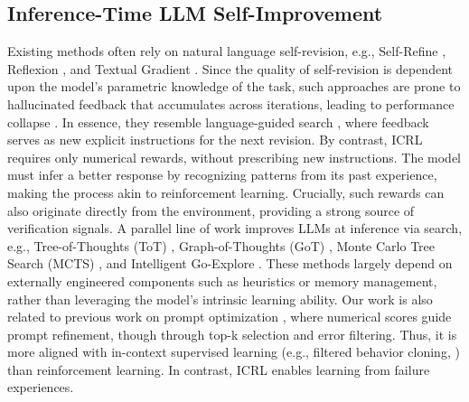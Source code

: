 \documentclass{article}
\newcommand{\0}{\mathbf{0}}
\begin{document}

\subsection{Inference-Time LLM Self-Improvement}
\label{sec bkg self improvement}
Existing methods often rely on natural language self-revision, e.g., Self-Refine \citep{self-refine}, Reflexion \citep{shinn2023reflexion}, and Textual Gradient \citep{textgrad}. Since the quality of self-revision is dependent upon the model's parametric knowledge of the task, such approaches are prone to hallucinated feedback that accumulates across iterations, leading to performance collapse \citep{self-verification-limitation}. In essence, they resemble language-guided search \citep{liu2025synthesizing}, where feedback serves as new explicit instructions for the next revision.
By contrast, ICRL requires only numerical rewards, without prescribing new instructions. The model must infer a better response by recognizing patterns from its past experience, making the process akin to reinforcement learning. Crucially, such rewards can also originate directly from the environment, providing a strong source of verification signals.
A parallel line of work improves LLMs at inference via search, e.g., Tree-of-Thoughts (ToT) \citep{tot}, Graph-of-Thoughts (GoT) \citep{GoT}, Monte Carlo Tree Search (MCTS) \citep{everything-of-thought}, and Intelligent Go-Explore \citep{intelligent-go-explore}. These methods largely depend on externally engineered components such as heuristics or memory management, rather than leveraging the model’s intrinsic learning ability. Our work is also related to previous work on prompt optimization
\citep{llm_as_optimizers}, where numerical scores guide prompt refinement, though through top-k selection and error filtering. Thus, it is more aligned with in-context supervised learning (e.g., filtered behavior cloning, \citet{grigsby2023amago}) than reinforcement learning. In contrast, ICRL enables learning from failure experiences.
\end{document}

